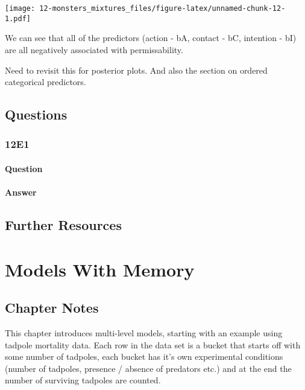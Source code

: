 \documentclass[
]{book}
\begin{document}
\texttt{[image: 12-monsters\_mixtures\_files/figure-latex/unnamed-chunk-12-1.pdf]}

We can see that all of the predictors (action - bA, contact - bC, intention - bI) are all negatively associated with permissability.

Need to revisit this for posterior plots. And also the section on ordered categorical predictors.

\hypertarget{questions-11}{%
\section{Questions}\label{questions-11}}

\hypertarget{e1-9}{%
\subsection*{12E1}\label{e1-9}}

\hypertarget{question-98}{%
\subsubsection*{Question}\label{question-98}}

\hypertarget{answer-98}{%
\subsubsection*{Answer}\label{answer-98}}

\hypertarget{further-resources-2}{%
\section*{Further Resources}\label{further-resources-2}}

\hypertarget{models_memory}{%
\chapter{Models With Memory}\label{models_memory}}

\hypertarget{chapter-notes-12}{%
\section{Chapter Notes}\label{chapter-notes-12}}

This chapter introduces multi-level models, starting with an example using tadpole mortality data. Each row in the data set is a bucket that starts off with some number of tadpoles, each bucket has it's own experimental conditions (number of tadpoles, presence / absence of predators etc.) and at the end the number of surviving tadpoles are counted.
\end{document}
